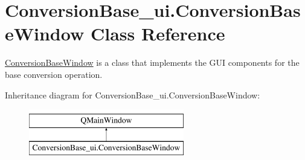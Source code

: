 \hypertarget{class_conversion_base__ui_1_1_conversion_base_window}{}\section{Conversion\+Base\+\_\+ui.\+Conversion\+Base\+Window Class Reference}
\label{class_conversion_base__ui_1_1_conversion_base_window}


\hyperlink{class_conversion_base__ui_1_1_conversion_base_window}{Conversion\+Base\+Window} is a class that implements the G\+UI components for the base conversion operation.  


Inheritance diagram for Conversion\+Base\+\_\+ui.\+Conversion\+Base\+Window\+:\begin{figure}[H]
\begin{center}
\leavevmode
\includegraphics[height=2.000000cm]{class_conversion_base__ui_1_1_conversion_base_window}
\end{center}
\end{figure}
